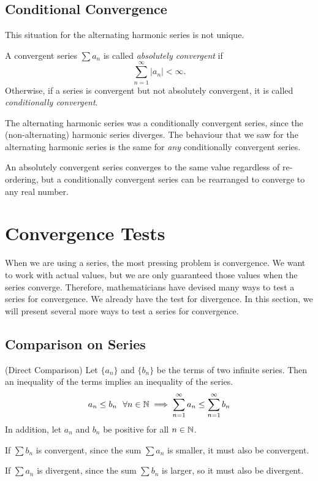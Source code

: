 \documentclass[fleqn]{report}
\begin{document}
\subsection{Conditional Convergence}
\label{conditional}

This situation for the alternating harmonic series is not
unique. 

\begin{defn}A convergent series $\sum a_n$ is called
\emph{absolutely convergent} if 
\begin{equation*}
\sum_{n=1}^\infty |a_n| < \infty.
\end{equation*}
Otherwise, if a series is convergent but not absolutely
convergent, it is called \emph{conditionally convergent}.
\end{defn}

The alternating harmonic series was a conditionally convergent
series, since the (non-alternating) harmonic series diverges.
The behaviour that we saw for the alternating harmonic series
is the same for \emph{any} conditionally convergent series.

\begin{prop}
An absolutely convergent series converges to the same value
regardless of re-ordering, but a conditionally convergent
series can be rearranged to converge to any real
number.\end{prop}

\section{Convergence Tests}
\label{convergence-tests}

When we are using a series, the most pressing problem is
convergence. We want to work with actual values, but we are
only guaranteed those values when the series converge. 
Therefore, mathematicians have devised many ways to test a
series for convergence. We already have the test for
divergence. In this section, we will present several more
ways to test a series for convergence.

\subsection{Comparison on Series}
\label{comparison}

\begin{prop}(Direct Comparison) Let $\{a_n\}$ and $\{b_n\}$ be
the terms of two infinite series. Then an inequality of the terms
implies an inequality of the series. 
\begin{equation*}
a_n \leq b_n \ \ \forall n \in \mathbb{N} \implies \sum_{n=1}^\infty a_n \leq
\sum_{n=1}^\infty b_n
\end{equation*}
In addition, let $a_n$ and $b_n$ be positive for all
$n \in \mathbb{N}$.
\begin{smallitemize}
\item If $\sum b_n$ is convergent, since the sum $\sum a_n$
is smaller, it must also be convergent.
\item If $\sum a_n$ is divergent, since the sum $\sum
b_n$ is larger, so it must also be divergent.
\end{smallitemize}
\end{prop}
\end{document}
